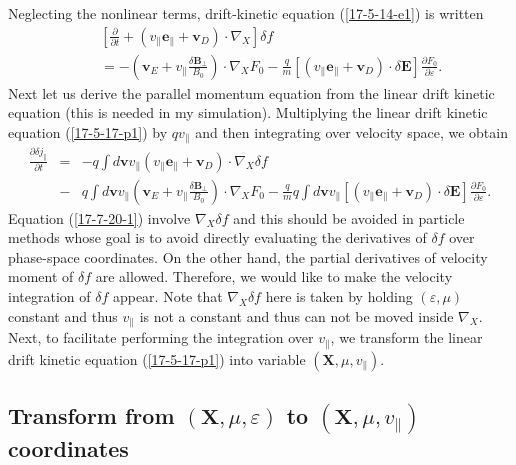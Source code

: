 \documentclass{llncs}
\begin{document}
Neglecting the nonlinear terms, drift-kinetic equation (\ref{17-5-14-e1}) is
written
\begin{eqnarray}
  &  & \left[ \frac{\partial}{\partial t} + (v_{\parallel}
  \mathbf{e}_{\parallel} +\mathbf{v}_D) \cdot \nabla_X \right] \delta f
  \nonumber\\
  &  & = - \left( \mathbf{v}_E + v_{\parallel} \frac{\delta
  \mathbf{B}_{\perp}}{B_0} \right) \cdot \nabla_X F_0 - \frac{q}{m}
  [(v_{\parallel} \mathbf{e}_{\parallel} +\mathbf{v}_D) \cdot \delta
  \mathbf{E}] \frac{\partial F_0}{\partial \varepsilon} .  \label{17-5-17-p1}
\end{eqnarray}
Next let us derive the parallel momentum equation from the linear drift
kinetic equation (this is needed in my simulation). Multiplying the linear
drift kinetic equation (\ref{17-5-17-p1}) by $q v_{\parallel}$ and then
integrating over velocity space, we obtain
\begin{eqnarray}
  \frac{\partial \delta j_{\parallel}}{\partial t} & = & - q \int
  d\mathbf{v}v_{\parallel} (v_{\parallel} \mathbf{e}_{\parallel}
  +\mathbf{v}_D) \cdot \nabla_X \delta f \nonumber\\
  & - & q \int d\mathbf{v}v_{\parallel} \left( \mathbf{v}_E + v_{\parallel}
  \frac{\delta \mathbf{B}_{\perp}}{B_0} \right) \cdot \nabla_X F_0 -
  \frac{q}{m} q \int d\mathbf{v}v_{\parallel} [(v_{\parallel}
  \mathbf{e}_{\parallel} +\mathbf{v}_D) \cdot \delta \mathbf{E}]
  \frac{\partial F_0}{\partial \varepsilon} .  \label{17-7-20-1}
\end{eqnarray}
Equation (\ref{17-7-20-1}) involve $\nabla_X \delta f$ and this should be
avoided in particle methods whose goal is to avoid directly evaluating the
derivatives of $\delta f$ over phase-space coordinates. On the other hand, the
partial derivatives of velocity moment of $\delta f$ are allowed. Therefore,
we would like to make the velocity integration of $\delta f$ appear. Note that
$\nabla_X \delta f$ here is taken by holding $(\varepsilon, \mu)$ constant and
thus $v_{\parallel}$ is not a constant and thus can not be moved inside
$\nabla_X$. Next, to facilitate performing the integration over
$v_{\parallel}$, we transform the linear drift kinetic equation
(\ref{17-5-17-p1}) into variable $(\mathbf{X}, \mu, v_{\parallel})$.

\subsection{Transform from $(\mathbf{X}, \mu, \varepsilon)$ to $(\mathbf{X},
\mu, v_{\parallel})$ coordinates}\label{17-6-16-e1}
\end{document}
